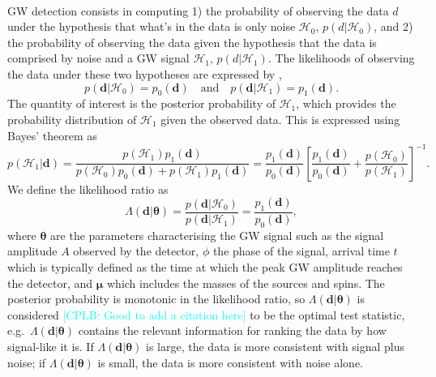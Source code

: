 \documentclass[a4paper,12pt]{article}
\newcommand{\cplb}[1]{\textcolor{cyan}{[CPLB: #1]}}
\begin{document}
\paragraph{}
GW detection consists in computing 1) the probability of observing the data $d$ under the hypothesis that what's in the data is only noise $\mathcal{H}_0$, $p(d|\mathcal{H}_0)$, and 2) the probability of observing the data given the hypothesis that the data is comprised by noise and a GW signal $\mathcal{H}_1$, $p(d|\mathcal{H}_1)$. The likelihoods of observing the data under these two hypotheses are expressed by \cite{abbott2020guide},
\begin{equation}
p(\mathbf{d}|\mathcal{H}_0) = p_0(\mathbf{d}) \quad \text{and} \quad p(\mathbf{d}|\mathcal{H}_1) = p_1(\mathbf{d}).
\label{eq:hypotheses}
\end{equation}
The quantity of interest is the posterior probability of $\mathcal{H}_1$, which provides the probability distribution of $\mathcal{H}_1$ given the observed data. This is expressed using Bayes' theorem as 
\begin{equation}
p(\mathcal{H}_{1}|\mathbf{d}) = \frac{p(\mathcal{H}_1)p_{1}(\mathbf{d})}{p(\mathcal{H}_{0})p_{0}(\mathbf{d})+p(\mathcal{H}_{1})p_{1}(\mathbf{d})} =  \frac{p_{1}(\mathbf{d})}{p_{0}(\mathbf{d})}\left[\frac{p_{1}(\mathbf{d})}{p_{0}(\mathbf{d})}+\frac{p(\mathcal{H}_{0})}{p(\mathcal{H}_{1})}\right]^{-1}.
\label{eq:BayesH0H1}
\end{equation}
We define the likelihood ratio as
\begin{equation}
\Lambda (\mathbf{d}|\boldsymbol{\theta}) = \frac{p(\mathbf{d}|\mathcal{H}_0)}{p(\mathbf{d}|\mathcal{H}_1)} = \frac{p_1(\mathbf{d})}{p_0(\mathbf{d})},
\label{eq:likelihoodratio}
\end{equation}
where $\boldsymbol{\theta}$ are the parameters characterising the GW signal such as the signal amplitude $A$ observed by the detector, $\phi$ the phase of the signal, arrival time $t$ which is typically defined as the time at which the peak GW amplitude reaches the detector, and $\boldsymbol{\mu}$ which includes the masses of the sources and spins. The posterior probability is monotonic in the likelihood ratio, so $\Lambda (\mathbf{d}|\boldsymbol{\theta})$ is considered \cplb{Good to add a citation here} to be the optimal test statistic, e.g.\ $\Lambda (\mathbf{d}|\boldsymbol{\theta})$ contains the relevant information for ranking the data by how signal-like it is. If $\Lambda (\mathbf{d}|\boldsymbol{\theta})$ is large, the data is more consistent with signal plus noise; if $\Lambda (\mathbf{d}|\boldsymbol{\theta})$ is small, the data is more consistent with noise alone.
\end{document}
